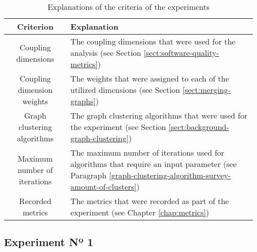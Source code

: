 \documentclass[12pt,a4paper]{report}
\begin{document}
\begin{table}[ht!]
\def\arraystretch{1.55}
\begin{tabularx}{\textwidth}{|c|X|}
\hline
Criterion & Explanation \\
\hline\hline

Coupling dimensions            & The coupling dimensions that were used for the analysis (see Section \ref{sect:software-quality-metrics}) \\\hline

Coupling dimension weights     & The weights that were assigned to each of the utilized dimensions (see Section \ref{sect:merging-graphs}) \\\hline

Graph clustering algorithms    & The graph clustering algorithms that were used for the experiment (see Section \ref{sect:background-graph-clustering}) \\\hline

Maximum number of iterations   & The maximum number of iterations used for algorithms that require an input parameter (see Paragraph \ref{graph-clustering-algorithm-survey-amount-of-clusters}) \\\hline

Recorded metrics               & The metrics that were recorded as part of the experiment (see Chapter \ref{chap:metrics}) \\\hline

\end{tabularx}
\caption{Explanations of the criteria of the experiments}
\label{table:experiment-criteria}
\end{table}


\subsection{Experiment Nº 1}
\end{document}
